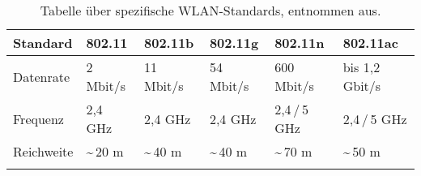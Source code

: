 \begin{table}[htbp]
	\centering
	\renewcommand{\arraystretch}{1.2}
	\begin{tabular}{llllll}
		\hline
		{Standard} & {802.11} & {802.11b} & {802.11g} & {802.11n} & {802.11ac}\\
		\hline
		Datenrate & 2 Mbit/s & 11 Mbit/s & 54 Mbit/s & 600 Mbit/s & bis 1,2 Gbit/s \\
		Frequenz & 2,4 GHz & 2,4 GHz & 2,4 GHz & 2,4\,/\,5 GHz & 2,4\,/\,5 GHz \\
		Reichweite & \textasciitilde\,20 m & \textasciitilde\,40 m & \textasciitilde\,40 m & \textasciitilde\,70 m & \textasciitilde\,50 m \\
		\hline
		\newline
	\end{tabular}
	\renewcommand{\arraystretch}{1}
	
	\caption[Tabelle über spezifische WLAN-Standards.] {Tabelle über spezifische WLAN-Standards, entnommen aus.\footnotemark}          
	\label{tab-wifi3}
	
\end{table}

